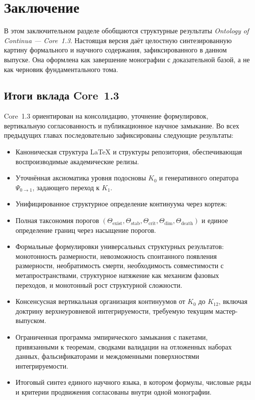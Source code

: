 
\section{Заключение}
\label{sec:conclusion}

В этом заключительном разделе обобщаются структурные результаты
\emph{Ontology of Continua --- Core~1.3}. Настоящая версия даёт целостную
синтезированную картину формального и научного содержания, зафиксированного в
данном выпуске. Она оформлена как завершение монографии с доказательной базой,
а не как черновик фундаментального тома.

\subsection{Итоги вклада Core~1.3}

Core~1.3 ориентирован на консолидацию, уточнение формулировок, вертикальную
согласованность и публикационное научное замыкание.
Во всех предыдущих главах последовательно зафиксированы следующие результаты:

\begin{itemize}
    \item Каноническая структура \LaTeX{} и структуры репозитория, обеспечивающая
          воспроизводимые академические релизы.
    \item Уточнённая аксиоматика уровня подосновы \(K_0\) и генеративного оператора
          \(\Psi_{0\to 1}\), задающего переход к \(K_1\).
    \item Унифицированное структурное определение континуума через кортеж:
          \\[
              K = \big(\Omega(K), A(K), P(t), J(t), \Theta(K), \partial\Omega(K), C(K), k(K,t)\big).
          \\]
    \item Полная таксономия порогов
          \((\Theta_{\mathrm{exist}}, \Theta_{\mathrm{stab}}, \Theta_{\mathrm{crit}},
            \Theta_{\mathrm{dim}}, \Theta_{\mathrm{death}})\)
          и единое определение границ через насыщение порогов.
    \item Формальные формулировки универсальных структурных результатов:
          монотонность размерности,
          невозможность спонтанного появления размерности,
          необратимость смерти,
          необходимость совместимости с метапространствами,
          структурное натяжение как механизм фазовых переходов,
          и монотонный рост структурной сложности.
    \item Консенсусная вертикальная организация континуумов от \(K_0\) до \(K_{12}\),
          включая доктрину верхнеуровневой интегрируемости, требуемую текущим
          мастер-выпуском.
    \item Ограниченная программа эмпирического замыкания с пакетами, привязанными к
          теоремам, сводками валидации на отложенных наборах данных, фальсификаторами
          и междоменными поверхностями интегрируемости.
    \item Итоговый синтез единого научного языка, в котором формулы, числовые ряды и
          критерии продвижения согласованы внутри одной монографии.
\end{itemize}

